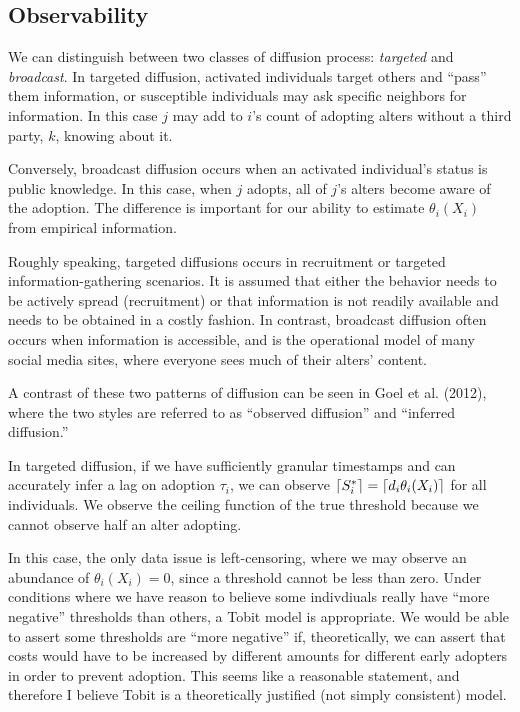 \documentclass{article}
\DeclarePairedDelimiter{\ceil}{\lceil}{\rceil}
\begin{document}
\subsection{Observability}

We can distinguish between two classes of diffusion process: \emph{targeted} and \emph{broadcast}. In targeted diffusion, activated individuals target others and ``pass'' them information, or susceptible individuals may ask specific neighbors for information. In this case $j$ may add to $i$'s count of adopting alters without a third party, $k$, knowing about it.

Conversely, broadcast diffusion occurs when an activated individual's status is public knowledge. In this case, when $j$ adopts, all of $j$'s alters become aware of the adoption. The difference is important for our ability to estimate $\theta_i(X_i)$ from empirical information.

Roughly speaking, targeted diffusions occurs in recruitment or targeted information-gathering scenarios. It is assumed that either the behavior needs to be actively spread (recruitment) or that information is not readily available and needs to be obtained in a costly fashion. In contrast, broadcast diffusion often occurs when information is accessible, and is the operational model of many social media sites, where everyone sees much of their alters' content.

A contrast of these two patterns of diffusion can be seen in Goel et al. (2012), where the two styles are referred to as ``observed diffusion'' and ``inferred diffusion.''

In targeted diffusion, if we have sufficiently granular timestamps and can accurately infer a lag on adoption $\tau_i$, we can observe $\ceil{S_i^*} = \ceil{d_i \theta_i(X_i)}$ for all individuals. We observe the ceiling function of the true threshold because we cannot observe half an alter adopting.

In this case, the only data issue is left-censoring, where we may observe an abundance of $\theta_i(X_i) = 0$, since a threshold cannot be less than zero. Under conditions where we have reason to believe some indivdiuals really have ``more negative'' thresholds than others, a Tobit model is appropriate. We would be able to assert some thresholds are ``more negative'' if, theoretically, we can assert that costs would have to be increased by different amounts for different early adopters in order to prevent adoption. This seems like a reasonable statement, and therefore I believe Tobit is a theoretically justified (not simply consistent) model.
\end{document}
